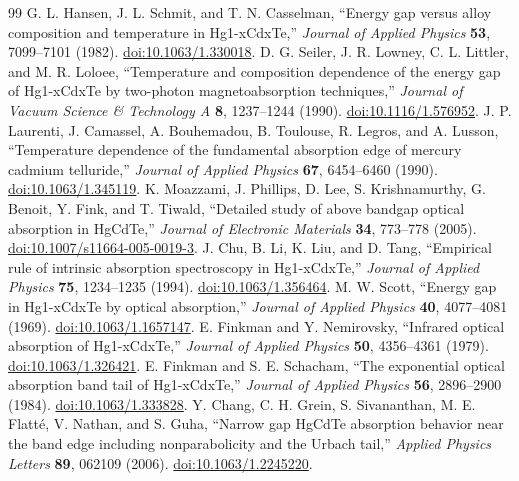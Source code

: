 \begin{thebibliography}{99}
 G. L. Hansen, J. L. Schmit, and T. N. Casselman, ``Energy gap versus alloy composition and temperature in Hg1-xCdxTe,'' \emph{Journal of Applied Physics} \textbf{53}, 7099--7101 (1982). \href{https://doi.org/10.1063/1.330018}{doi:10.1063/1.330018}.
 D. G. Seiler, J. R. Lowney, C. L. Littler, and M. R. Loloee, ``Temperature and composition dependence of the energy gap of Hg1-xCdxTe by two-photon magnetoabsorption techniques,'' \emph{Journal of Vacuum Science \& Technology A} \textbf{8}, 1237--1244 (1990). \href{https://doi.org/10.1116/1.576952}{doi:10.1116/1.576952}.
 J. P. Laurenti, J. Camassel, A. Bouhemadou, B. Toulouse, R. Legros, and A. Lusson, ``Temperature dependence of the fundamental absorption edge of mercury cadmium telluride,'' \emph{Journal of Applied Physics} \textbf{67}, 6454--6460 (1990). \href{https://doi.org/10.1063/1.345119}{doi:10.1063/1.345119}.
 K. Moazzami, J. Phillips, D. Lee, S. Krishnamurthy, G. Benoit, Y. Fink, and T. Tiwald, ``Detailed study of above bandgap optical absorption in HgCdTe,'' \emph{Journal of Electronic Materials} \textbf{34}, 773--778 (2005). \href{https://doi.org/10.1007/s11664-005-0019-3}{doi:10.1007/s11664-005-0019-3}.
 J. Chu, B. Li, K. Liu, and D. Tang, ``Empirical rule of intrinsic absorption spectroscopy in Hg1-xCdxTe,'' \emph{Journal of Applied Physics} \textbf{75}, 1234--1235 (1994). \href{https://doi.org/10.1063/1.356464}{doi:10.1063/1.356464}.
 M. W. Scott, ``Energy gap in Hg1-xCdxTe by optical absorption,'' \emph{Journal of Applied Physics} \textbf{40}, 4077--4081 (1969). \href{https://doi.org/10.1063/1.1657147}{doi:10.1063/1.1657147}.
 E. Finkman and Y. Nemirovsky, ``Infrared optical absorption of Hg1-xCdxTe,'' \emph{Journal of Applied Physics} \textbf{50}, 4356--4361 (1979). \href{https://doi.org/10.1063/1.326421}{doi:10.1063/1.326421}.
 E. Finkman and S. E. Schacham, ``The exponential optical absorption band tail of Hg1-xCdxTe,'' \emph{Journal of Applied Physics} \textbf{56}, 2896--2900 (1984). \href{https://doi.org/10.1063/1.333828}{doi:10.1063/1.333828}.
 Y. Chang, C. H. Grein, S. Sivananthan, M. E. Flatt\'e, V. Nathan, and S. Guha, ``Narrow gap HgCdTe absorption behavior near the band edge including nonparabolicity and the Urbach tail,'' \emph{Applied Physics Letters} \textbf{89}, 062109 (2006). \href{https://doi.org/10.1063/1.2245220}{doi:10.1063/1.2245220}.

\end{thebibliography}
